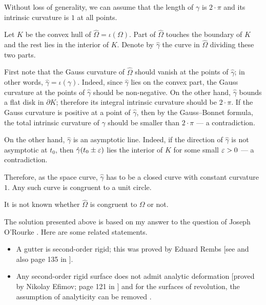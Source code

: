 Without loss of generality, we can assume that the length of $\gamma$ is $2{\cdot}\pi$ and its intrinsic curvature is $1$ at all points.

Let $K$ be the convex hull of $\hat\Omega=\iota(\Omega)$.
Part of $\hat\Omega$ touches the boundary of $K$ and the rest lies in the interior of $K$. 
Denote by $\hat\gamma$ the curve in $\hat\Omega$ dividing these two parts.

First note that the Gauss curvature of $\hat\Omega$ should vanish at the points of $\hat\gamma$;
in other words, $\hat\gamma=\iota(\gamma)$.
Indeed, since $\hat\gamma$ lies on the convex part, 
the Gauss curvature at the points of $\hat\gamma$ should be non-negative. 
On the other hand, $\hat\gamma$ bounds a flat disk in $\partial K$;
therefore its integral intrinsic curvature should be $2{\cdot}\pi$.
If the Gauss curvature is positive at a point of $\hat\gamma$, 
then by the Gauss--Bonnet formula, the total intrinsic curvature of $\hat\gamma$ should be smaller than $2{\cdot}\pi$ --- a contradiction.

On the other hand, $\hat\gamma$ is an asymptotic line.
Indeed, if the direction of $\hat\gamma$ is not asymptotic at $t_0$,
then $\hat\gamma(t_0 \pm\varepsilon)$ lies the interior of $K$ for some small $\varepsilon>0$ --- a contradiction.

Therefore, as the space curve,
$\hat\gamma$ has to be a closed curve with constant curvature $1$.
Any such curve is congruent to a unit circle.\qeds

It is not known whether $\hat\Omega$ is congruent to $\Omega$ or not.

The solution presented above is based on my answer 
to the question of Joseph O'Rourke \cite{rourke}.
Here are some related statements.
\begin{itemize}
\item A gutter is second-order rigid;
this was proved by Eduard Rembs
[see  and also page 135 in ].
\item Any second-order rigid surface does not admit analytic deformation 
[proved by Nikolay Efimov; page 121 in ]
and for the surfaces of revolution, the assumption of analyticity can be removed 
\cite[proved by Idzhad Sabitov, see][]{sabitov}.
\end{itemize}









